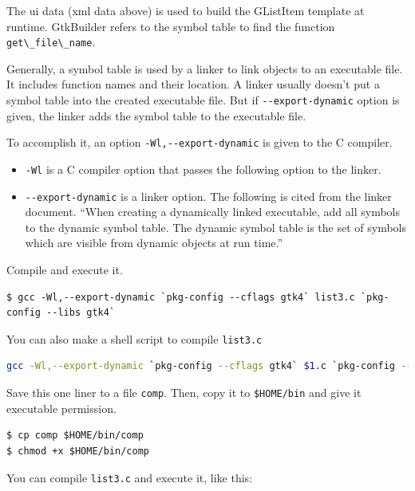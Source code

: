 The ui data (xml data above) is used to build the GListItem template at
runtime. GtkBuilder refers to the symbol table to find the function
\passthrough{\lstinline!get\_file\_name!}.

Generally, a symbol table is used by a linker to link objects to an
executable file. It includes function names and their location. A linker
usually doesn't put a symbol table into the created executable file. But
if \passthrough{\lstinline!--export-dynamic!} option is given, the
linker adds the symbol table to the executable file.

To accomplish it, an option
\passthrough{\lstinline!-Wl,--export-dynamic!} is given to the C
compiler.

\begin{itemize}
\tightlist
\item
  \passthrough{\lstinline!-Wl!} is a C compiler option that passes the
  following option to the linker.
\item
  \passthrough{\lstinline!--export-dynamic!} is a linker option. The
  following is cited from the linker document. ``When creating a
  dynamically linked executable, add all symbols to the dynamic symbol
  table. The dynamic symbol table is the set of symbols which are
  visible from dynamic objects at run time.''
\end{itemize}

Compile and execute it.

\begin{lstlisting}
$ gcc -Wl,--export-dynamic `pkg-config --cflags gtk4` list3.c `pkg-config --libs gtk4`
\end{lstlisting}

You can also make a shell script to compile
\passthrough{\lstinline!list3.c!}

\begin{lstlisting}[language=bash]
gcc -Wl,--export-dynamic `pkg-config --cflags gtk4` $1.c `pkg-config --libs gtk4`
\end{lstlisting}

Save this one liner to a file \passthrough{\lstinline!comp!}. Then, copy
it to \passthrough{\lstinline!$HOME/bin!} and give it executable
permission.

\begin{lstlisting}
$ cp comp $HOME/bin/comp
$ chmod +x $HOME/bin/comp
\end{lstlisting}

You can compile \passthrough{\lstinline!list3.c!} and execute it, like
this:

